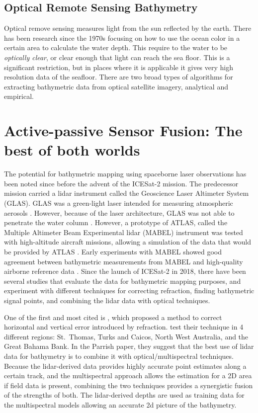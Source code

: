 \subsection{Optical Remote Sensing Bathymetry}
Optical remove sensing measures light from the sun reflected by the earth. There has been research since the 1970s focusing on how to use the ocean color in a certain area to calculate the water depth. This require to the water to be \emph{optically clear}, or clear enough that light can reach the sea floor. This is a significant restriction, but in places where it is applicable it gives very high resolution data of the seafloor. There are two broad types of algorithms for extracting bathymetric data from optical satellite imagery, analytical and empirical.

\section{Active-passive Sensor Fusion: The best of both worlds}

The potential for bathymetric mapping using spaceborne laser observations has been noted since before the advent of the ICESat-2 mission. The predecessor mission carried a lidar instrument called the Geoscience Laser Altimeter System (GLAS). GLAS was a green-light laser intended for measuring atmospheric aerosols \parencite{Abshire2005}. However, because of the laser architecture, GLAS was not able to penetrate the water column \parencite{Forfinski-Sarkozi2016}. However, a prototype of ATLAS, called the Multiple Altimeter Beam Experimental lidar (MABEL) instrument was tested with high-altitude aircraft missions, allowing a simulation of the data that would be provided by ATLAS \parencite{Mcgill2013}. Early experiments with MABEL showed good agreement between bathymetric measurements from MABEL and high-quality airborne reference data \parencite{Jasinski2016,Forfinski-Sarkozi2016}. Since the launch of ICESat-2 in 2018, there have been several studies that evaluate the data for bathymetric mapping purposes, and experiment with different techniques for correcting refraction, finding bathymetric signal points, and combining the lidar data with optical techniques. 

One of the first and most cited is \citeauthor{Parrish2019}, which proposed a method to correct horizontal and vertical error introduced by refraction. \citeauthor{Parrish2019} test their technique in 4 different regions: St.~Thomas, Turks and Caicos, North West Australia, and the Great Bahama Bank. In the Parrish paper, they suggest that the best use of lidar data for bathymetry is to combine it with optical/multispectral techniques. Because the lidar-derived data provides highly accurate point estimates along a certain track, and the multispectral approach allows the estimation for a 2D area if field data is present, combining the two techniques provides a synergistic fusion of the strengths of both. The lidar-derived depths are used as training data for the multispectral models allowing an accurate 2d picture of the bathymetry.

